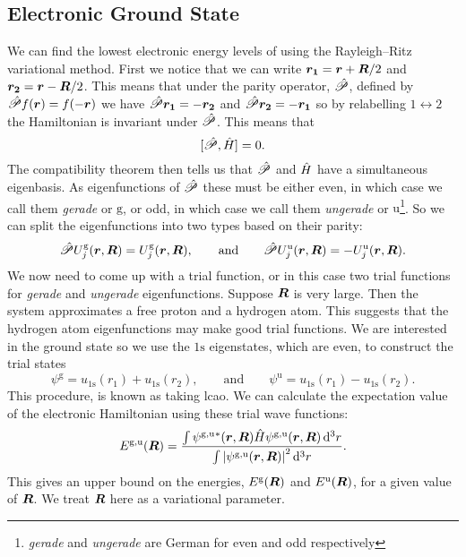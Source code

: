 \documentclass[a4paper]{article}
\newcommand{\parity}{\mathscr{P}}
\newcommand{\gerade}{\mathrm{g}}
\newcommand{\ungerade}{\mathrm{u}}
\begin{document}
    \subsection{Electronic Ground State}
    We can find the lowest electronic energy levels of  using the Rayleigh--Ritz variational method.
    First we notice that we can write \(\bm{r_1} = \bm{r} + \bm{R}/2\) and \(\bm{r_2} = \bm{r} - \bm{R}/2\).
    This means that under the parity operator, \(\operator{\parity}\), defined by \(\operator{\parity}f(\vv{r}) = f(-\vv{r})\) we have \(\operator{\parity}\vv{r_1} = -\vv{r_2}\) and \(\operator{\parity}\vv{r_2} = -\vv{r_1}\) so by relabelling \(1 \leftrightarrow 2\) the Hamiltonian is invariant under \(\operator{\parity}\).
    This means that
    \[[\operator{\parity}, \operator{H}] = 0.\]
    The compatibility theorem then tells us that \(\operator{\parity}\) and \(\hat{H}\) have a simultaneous eigenbasis.
    As eigenfunctions of \(\operator{\parity}\) these must be either even, in which case we call them \textit{gerade} or \(\gerade\), or odd, in which case we call them \textit{ungerade} or \(\ungerade\)\footnote{\textit{gerade} and \textit{ungerade} are German for even and odd respectively}.
    So we can split the eigenfunctions into two types based on their parity:
    \[\operator{\parity}U_j^{\gerade}(\vv{r}, \vv{R}) = U_{j}^{\gerade}(\vv{r}, \vv{R}), \qquad \text{and} \qquad \operator{\parity}U_j^{\ungerade}(\vv{r}, \vv{R}) = -U_j^{\ungerade}(\vv{r}, \vv{R}).\]
    We now need to come up with a trial function, or in this case two trial functions for \textit{gerade} and \textit{ungerade} eigenfunctions.
    Suppose \(\bm{R}\) is very large.
    Then the system approximates a free proton and a hydrogen atom.
    This suggests that the hydrogen atom eigenfunctions may make good trial functions.
    We are interested in the ground state so we use the \(1\mathrm{s}\) eigenstates, which are even, to construct the trial states
    \[\psi^{\gerade} = u_{1\mathrm{s}}(r_1) + u_{1\mathrm{s}}(r_2), \qquad\text{and}\qquad \psi^{\ungerade} = u_{1\mathrm{s}}(r_1) - u_{1\mathrm{s}}(r_2).\]
    This procedure, is known as taking \gls{lcao}.
    We can calculate the expectation value of the electronic Hamiltonian using these trial wave functions:
    \[E^{\gerade,\ungerade}(\vv{R}) = \frac{\int \psi^{\gerade,\ungerade}{^*}(\vv{r}, \vv{R})\operator{H}\psi^{\gerade,\ungerade}(\vv{r}, \vv{R})\dd[3]{r}}{\int \abs{\psi^{\gerade,\ungerade}(\vv{r}, \vv{R})}^2\dd[3]{r}}.\]
    This gives an upper bound on the energies, \(E^{\gerade}(\vv{R})\) and \(E^{\ungerade}(\vv{R})\), for a given value of \(\bm{R}\).
    We treat \(\bm{R}\) here as a variational parameter.
    
\end{document}
